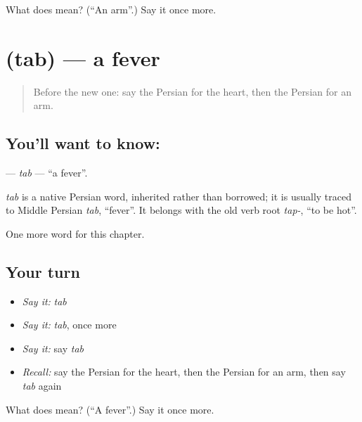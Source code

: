 \begin{tcolorbox}[breakable,colback=teal!4,colframe=teal!35!black,title={Before you move on}]
What does  mean? (\textquotedblleft{}An arm\textquotedblright{}.) Say it once more.
\end{tcolorbox}
\section[\texorpdfstring{\fa{تب} (tab)}{تب (tab)}]{ (tab) — a fever}

\label{lesson:FA-C30-tab}



\begin{quote}
Before the new one: say the Persian for the heart, then the Persian for an arm.
\end{quote}

\subsection*{You'll want to know: }
\textbf{} — \emph{tab} — \textquotedblleft{}a fever\textquotedblright{}.

\begin{cousinweb}
\emph{tab} is a native Persian word, inherited rather than borrowed; it is usually traced to Middle Persian \emph{tab}, \textquotedblleft{}fever\textquotedblright{}. It belongs with the old verb root \emph{tap-}, \textquotedblleft{}to be hot\textquotedblright{}.
\end{cousinweb}

\begin{grammarlens}[title={What you've built}]
One more word for this chapter.
\end{grammarlens}

\subsection*{Your turn}
\begin{itemize}
\raggedright
  \item \emph{Say it:} \emph{tab}
  \item \emph{Say it:} \emph{tab}, once more
  \item \emph{Say it:} say \emph{tab}
  \item \emph{Recall:} say the Persian for the heart, then the Persian for an arm, then say \emph{tab} again
\end{itemize}

\begin{tcolorbox}[breakable,colback=teal!4,colframe=teal!35!black,title={Before you move on}]
What does  mean? (\textquotedblleft{}A fever\textquotedblright{}.) Say it once more.
\end{tcolorbox}
